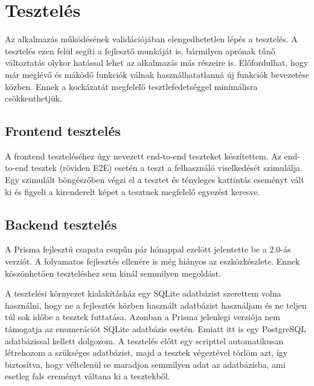 \chapter{Tesztelés}

Az alkalmazás működésének validációjában elengedhetetlen lépés a tesztelés.
A tesztelés ezen felül segíti a fejlesztő munkáját is, bármilyen aprónak tűnő változtatás olykor hatással lehet az alkalmazás más részeire is.
Előfordulhat, hogy már meglévő és máködő funkciók válnak használhatatlanná új funkciók bevezetése közben.
Ennek a kockázatát megfelelő tesztlefedetséggel minimálisra csökkenthetjük.

\section{Frontend tesztelés}

A frontend teszteléséhez úgy nevezett end-to-end teszteket készítettem.
Az end-to-end tesztek (röviden E2E) esetén a teszt a felhasználó viselkedését szimulálja.
Egy szimulált böngészőben végzi el a tesztet és tényleges kattintás eseményt vált ki és figyeli a kirenderelt képet a tesztnek megfelelő egyezést keresve.


\section{Backend tesztelés}
A Prisma fejlesztú csapata csupűn pár hónappal ezelött jelentette be a 2.0-ás verziót.
A folyamatos fejlesztés ellenére is még hiányos az eszközkészlete.
Ennek köszönhetően teszteléshez sem kinál semmilyen megoldást.

A tesztelési környezet kialakításház egy SQLite adatbázist szerettem volna használni, hogy ne a fejlesztés közben használt adatbázist használjam és ne teljen túl sok időbe a tesztek futtatása.
Azonban a Prisma jelenlegi verziója nem támogatja az enumerációt SQLite adatbázis esetén.
Emiatt itt is egy PostgreSQL adatbázissal kellett dolgozom.
A tesztelés előtt egy scripttel automatikusan létrehozom a szükséges adatbázist, majd a tesztek végeztével törlöm azt, így biztosítva, hogy véltelenül se maradjon semmilyen adat az adatbázisba, ami esetleg fals ereményt váltana ki a tesztekből.

